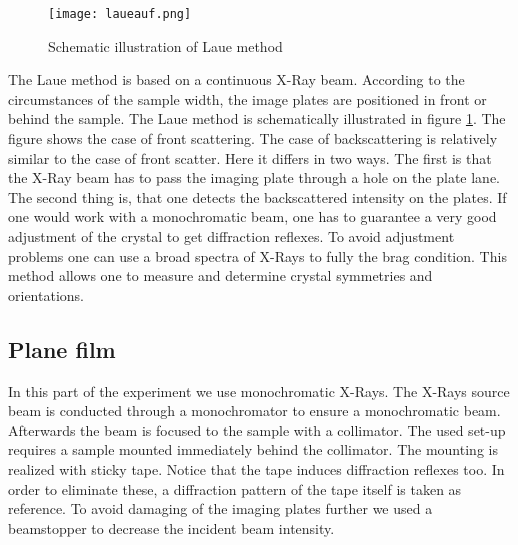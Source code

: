 	\begin{figure}[h]
		\centering
		\texttt{[image: laueauf.png]}
		\caption{Schematic illustration of Laue method}
		\label{laueauf}
	\end{figure}
	The Laue method is based on a continuous X-Ray beam. According to the circumstances of the sample width, the image plates are positioned in front or behind the sample. The Laue method is schematically illustrated in figure \ref{laueauf}. The figure shows the case of front scattering. The case of backscattering is relatively similar to the case of front scatter. Here it differs in two ways. The first is that the X-Ray beam has to pass the imaging plate through a hole on the plate lane. The second thing is, that one detects the backscattered intensity on the plates. If one would work with a monochromatic beam, one has to guarantee a very good adjustment of the crystal to get diffraction reflexes. To avoid adjustment problems one can use a broad spectra of X-Rays to fully the brag condition. This method allows one to measure and determine crystal symmetries and orientations.
	
	\subsection{Plane film}
	In this part of the experiment we use monochromatic X-Rays. The X-Rays source beam is conducted through a monochromator to ensure a monochromatic beam. Afterwards the beam is focused to the sample with a collimator. The used set-up requires a sample mounted immediately behind the collimator. The mounting is realized with sticky tape. Notice that the tape induces diffraction reflexes too. In order to eliminate these, a diffraction pattern of the tape itself is taken as reference. To avoid damaging of the imaging plates further we used a beamstopper to decrease the incident beam intensity.
	
